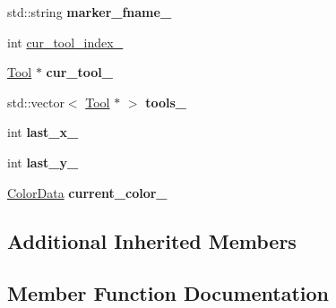 \begin{DoxyCompactItemize}
\item 
std\+::string {\bfseries marker\+\_\+fname\+\_\+}\hypertarget{classimage__tools_1_1MIAApp_a291206124f9901005656d58a71b46e23}{}\label{classimage__tools_1_1MIAApp_a291206124f9901005656d58a71b46e23}

\item 
int \hyperlink{classimage__tools_1_1MIAApp_af1cfe4f287c9189ba71fe82b3d692512}{cur\+\_\+tool\+\_\+index\+\_\+}
\item 
\hyperlink{classTool}{Tool} $\ast$ {\bfseries cur\+\_\+tool\+\_\+}\hypertarget{classimage__tools_1_1MIAApp_a3b4e304ce802b266ec848731dea8cd63}{}\label{classimage__tools_1_1MIAApp_a3b4e304ce802b266ec848731dea8cd63}

\item 
std\+::vector$<$ \hyperlink{classTool}{Tool} $\ast$ $>$ {\bfseries tools\+\_\+}\hypertarget{classimage__tools_1_1MIAApp_a89c184b959b2c88cd80facd6aa74e2a5}{}\label{classimage__tools_1_1MIAApp_a89c184b959b2c88cd80facd6aa74e2a5}

\item 
int {\bfseries last\+\_\+x\+\_\+}\hypertarget{classimage__tools_1_1MIAApp_afc606cd1bb49fcc0fc0075acd8c698b3}{}\label{classimage__tools_1_1MIAApp_afc606cd1bb49fcc0fc0075acd8c698b3}

\item 
int {\bfseries last\+\_\+y\+\_\+}\hypertarget{classimage__tools_1_1MIAApp_a66d3c12e62708bc4c568c8ad72d884b9}{}\label{classimage__tools_1_1MIAApp_a66d3c12e62708bc4c568c8ad72d884b9}

\item 
\hyperlink{classimage__tools_1_1ColorData}{Color\+Data} {\bfseries current\+\_\+color\+\_\+}\hypertarget{classimage__tools_1_1MIAApp_ae53c9fd49d937636d4a8cdfc14ad7822}{}\label{classimage__tools_1_1MIAApp_ae53c9fd49d937636d4a8cdfc14ad7822}

\end{DoxyCompactItemize}
\subsection*{Additional Inherited Members}


\subsection{Member Function Documentation}
